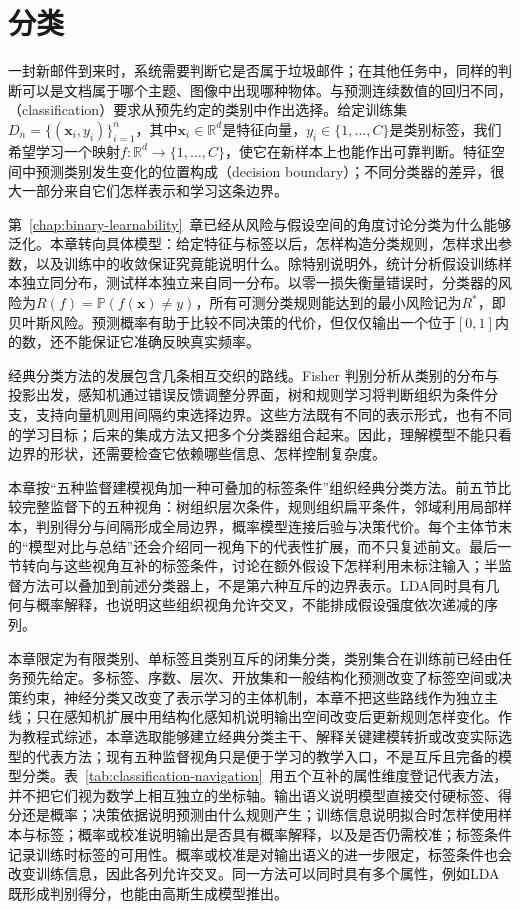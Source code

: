 \chapter{分类}
\label{chap:classification}

一封新邮件到来时，系统需要判断它是否属于垃圾邮件；在其他任务中，同样的判断可以是文档属于哪个主题、图像中出现哪种物体。与预测连续数值的回归不同，（classification）要求从预先约定的类别中作出选择。给定训练集$D_n=\{(\bm{x}_i,y_i)\}_{i=1}^{n}$，其中$\bm{x}_i\in\mathbb{R}^{d}$是特征向量，$y_i\in\{1,\dots,C\}$是类别标签，我们希望学习一个映射$f:\mathbb{R}^{d}\to\{1,\dots,C\}$，使它在新样本上也能作出可靠判断。特征空间中预测类别发生变化的位置构成（decision boundary）；不同分类器的差异，很大一部分来自它们怎样表示和学习这条边界。

第~\ref{chap:binary-learnability}~章已经从风险与假设空间的角度讨论分类为什么能够泛化。本章转向具体模型：给定特征与标签以后，怎样构造分类规则，怎样求出参数，以及训练中的收敛保证究竟能说明什么。除特别说明外，统计分析假设训练样本独立同分布，测试样本独立来自同一分布。以零一损失衡量错误时，分类器的风险为$R(f)=\mathbb{P}(f(\bm{x})\ne y)$，所有可测分类规则能达到的最小风险记为$R^\ast$，即贝叶斯风险。预测概率有助于比较不同决策的代价，但仅仅输出一个位于$[0,1]$内的数，还不能保证它准确反映真实频率。

经典分类方法的发展包含几条相互交织的路线。Fisher 判别分析从类别的分布与投影出发，感知机通过错误反馈调整分界面，树和规则学习将判断组织为条件分支，支持向量机则用间隔约束选择边界。这些方法既有不同的表示形式，也有不同的学习目标；后来的集成方法又把多个分类器组合起来。因此，理解模型不能只看边界的形状，还需要检查它依赖哪些信息、怎样控制复杂度。

本章按“五种监督建模视角加一种可叠加的标签条件”组织经典分类方法。前五节比较完整监督下的五种视角：树组织层次条件，规则组织扁平条件，邻域利用局部样本，判别得分与间隔形成全局边界，概率模型连接后验与决策代价。每个主体节末的“模型对比与总结”还会介绍同一视角下的代表性扩展，而不只复述前文。最后一节转向与这些视角互补的标签条件，讨论在额外假设下怎样利用未标注输入；半监督方法可以叠加到前述分类器上，不是第六种互斥的边界表示。LDA同时具有几何与概率解释，也说明这些组织视角允许交叉，不能排成假设强度依次递减的序列。

本章限定为有限类别、单标签且类别互斥的闭集分类，类别集合在训练前已经由任务预先给定。多标签、序数、层次、开放集和一般结构化预测改变了标签空间或决策约束，神经分类又改变了表示学习的主体机制，本章不把这些路线作为独立主线；只在感知机扩展中用结构化感知机说明输出空间改变后更新规则怎样变化。作为教程式综述，本章选取能够建立经典分类主干、解释关键建模转折或改变实际选型的代表方法；现有五种监督视角只是便于学习的教学入口，不是互斥且完备的模型分类。表~\ref{tab:classification-navigation}~用五个互补的属性维度登记代表方法，并不把它们视为数学上相互独立的坐标轴。输出语义说明模型直接交付硬标签、得分还是概率；决策依据说明预测由什么规则产生；训练信息说明拟合时怎样使用样本与标签；概率或校准说明输出是否具有概率解释，以及是否仍需校准；标签条件记录训练时标签的可用性。概率或校准是对输出语义的进一步限定，标签条件也会改变训练信息，因此各列允许交叉。同一方法可以同时具有多个属性，例如LDA既形成判别得分，也能由高斯生成模型推出。

